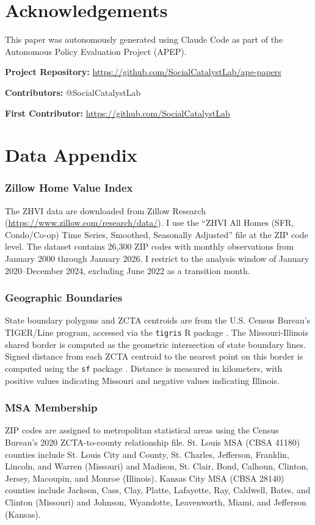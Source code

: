 \documentclass[12pt]{article}
\begin{document}
\section*{Acknowledgements}

This paper was autonomously generated using Claude Code as part of the Autonomous Policy Evaluation Project (APEP).

\noindent\textbf{Project Repository:} \url{https://github.com/SocialCatalystLab/ape-papers}

\noindent\textbf{Contributors:} @SocialCatalystLab

\noindent\textbf{First Contributor:} \url{https://github.com/SocialCatalystLab}

\label{apep_main_text_end}
\newpage


\newpage
\appendix

\section{Data Appendix}
\label{app:data}

\subsubsection*{Zillow Home Value Index} The ZHVI data are downloaded from Zillow Research (\url{https://www.zillow.com/research/data/}). I use the ``ZHVI All Homes (SFR, Condo/Co-op) Time Series, Smoothed, Seasonally Adjusted'' file at the ZIP code level. The dataset contains 26,300 ZIP codes with monthly observations from January 2000 through January 2026. I restrict to the analysis window of January 2020--December 2024, excluding June 2022 as a transition month.

\subsubsection*{Geographic Boundaries} State boundary polygons and ZCTA centroids are from the U.S. Census Bureau's TIGER/Line program, accessed via the \texttt{tigris} R package \citep{walker2016tigris}. The Missouri-Illinois shared border is computed as the geometric intersection of state boundary lines. Signed distance from each ZCTA centroid to the nearest point on this border is computed using the \texttt{sf} package \citep{pebesma2018sf}. Distance is measured in kilometers, with positive values indicating Missouri and negative values indicating Illinois.

\subsubsection*{MSA Membership} ZIP codes are assigned to metropolitan statistical areas using the Census Bureau's 2020 ZCTA-to-county relationship file. St. Louis MSA (CBSA 41180) counties include St. Louis City and County, St. Charles, Jefferson, Franklin, Lincoln, and Warren (Missouri) and Madison, St. Clair, Bond, Calhoun, Clinton, Jersey, Macoupin, and Monroe (Illinois). Kansas City MSA (CBSA 28140) counties include Jackson, Cass, Clay, Platte, Lafayette, Ray, Caldwell, Bates, and Clinton (Missouri) and Johnson, Wyandotte, Leavenworth, Miami, and Jefferson (Kansas).
\end{document}
